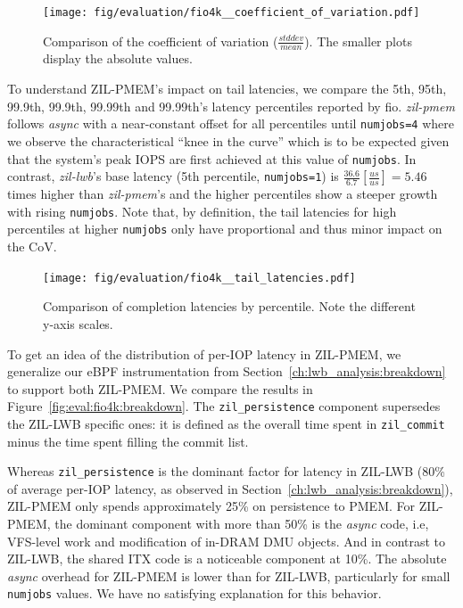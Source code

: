 \documentclass[12pt,a4paper,twoside]{book}
\begin{document}
\begin{figure}[H]
    \centering
    \texttt{[image: fig/evaluation/fio4k\_\_coefficient\_of\_variation.pdf]}
    \caption{Comparison of the coefficient of variation ($\frac{stddev}{mean}$). The smaller plots display the absolute values.}
    \label{fig:eval:fio4k:cov}
\end{figure}

To understand ZIL-PMEM's impact on tail latencies, we compare the 5th, 95th, 99.9th, 99.9th, 99.99th and 99.99th's latency percentiles reported by fio.
\textit{zil-pmem} follows \textit{async} with a near-constant offset for all percentiles until \lstinline{numjobs=4} where we observe the characteristical ``knee in the curve'' which is to be expected given that the system's peak IOPS are first achieved at this value of \lstinline{numjobs}.
In contrast, \textit{zil-lwb}'s base latency (5th percentile, \lstinline{numjobs=1}) is $\frac{36.6}{6.7} [\frac{us}{us}] = 5.46$ times higher than \textit{zil-pmem}'s and the higher percentiles show a steeper growth with rising \lstinline{numjobs}.
Note that, by definition, the tail latencies for high percentiles at higher \lstinline{numjobs} only have proportional and thus minor impact on the CoV.

\begin{figure}[H]
    \centering
    \texttt{[image: fig/evaluation/fio4k\_\_tail\_latencies.pdf]}
    \caption{Comparison of completion latencies by percentile. Note the different y-axis scales.}
\end{figure}

To get an idea of the distribution of per-IOP latency in ZIL-PMEM, we generalize our eBPF instrumentation from Section~\ref{ch:lwb_analysis:breakdown} to support both ZIL-PMEM.
We compare the results in Figure~\ref{fig:eval:fio4k:breakdown}.
The \lstinline{zil_persistence} component supersedes the ZIL-LWB specific ones: it is defined as the overall time spent in \lstinline{zil_commit} minus the time spent filling the commit list.

Whereas \lstinline{zil_persistence} is the dominant factor for latency in ZIL-LWB (80\% of average per-IOP latency, as observed in Section~\ref{ch:lwb_analysis:breakdown}), ZIL-PMEM only spends approximately 25\% on persistence to PMEM.
For ZIL-PMEM, the dominant component with more than 50\% is the \textit{async} code, i.e, VFS-level work and modification of in-DRAM DMU objects.
And in contrast to ZIL-LWB, the shared ITX code is a noticeable component at 10\%.
The absolute \textit{async} overhead for ZIL-PMEM is lower than for ZIL-LWB, particularly for small \lstinline{numjobs} values.
We have no satisfying explanation for this behavior.
\end{document}
